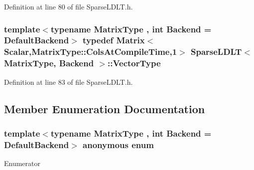 Definition at line 80 of file Sparse\-L\-D\-L\-T.\-h.

\hypertarget{class_sparse_l_d_l_t_a33b87d7a821b6945a50cf94417560656}{
\subsubsection[{Vector\-Type}]{\setlength{\rightskip}{0pt plus 5cm}template$<$typename Matrix\-Type , int Backend = Default\-Backend$>$ typedef {\bf Matrix}$<${\bf Scalar},Matrix\-Type\-::\-Cols\-At\-Compile\-Time,1$>$ {\bf Sparse\-L\-D\-L\-T}$<$ Matrix\-Type, Backend $>$\-::{\bf Vector\-Type}\hspace{0.3cm}{\ttfamily [protected]}}}\label{class_sparse_l_d_l_t_a33b87d7a821b6945a50cf94417560656}


Definition at line 83 of file Sparse\-L\-D\-L\-T.\-h.



\subsection{Member Enumeration Documentation}
\hypertarget{class_sparse_l_d_l_t_a4e6b50be694a6eb7d2a192fdc0edab81}{\subsubsection[{anonymous enum}]{\setlength{\rightskip}{0pt plus 5cm}template$<$typename Matrix\-Type , int Backend = Default\-Backend$>$ anonymous enum\hspace{0.3cm}{\ttfamily [protected]}}}\label{class_sparse_l_d_l_t_a4e6b50be694a6eb7d2a192fdc0edab81}
\begin{Desc}
\item[Enumerator]\par
\begin{description}
\item[{\em 
\hypertarget{class_sparse_l_d_l_t_a4e6b50be694a6eb7d2a192fdc0edab81a9971a44c20bd204dd44473238d053d67}{Supernodal\-Factor\-Is\-Dirty}\label{class_sparse_l_d_l_t_a4e6b50be694a6eb7d2a192fdc0edab81a9971a44c20bd204dd44473238d053d67}
}]\item[{\em 
\hypertarget{class_sparse_l_d_l_t_a4e6b50be694a6eb7d2a192fdc0edab81aacb1f7e05038ee470bc6698ea892565f}{Matrix\-L\-Is\-Dirty}\label{class_sparse_l_d_l_t_a4e6b50be694a6eb7d2a192fdc0edab81aacb1f7e05038ee470bc6698ea892565f}
}]\end{description}
\end{Desc}


